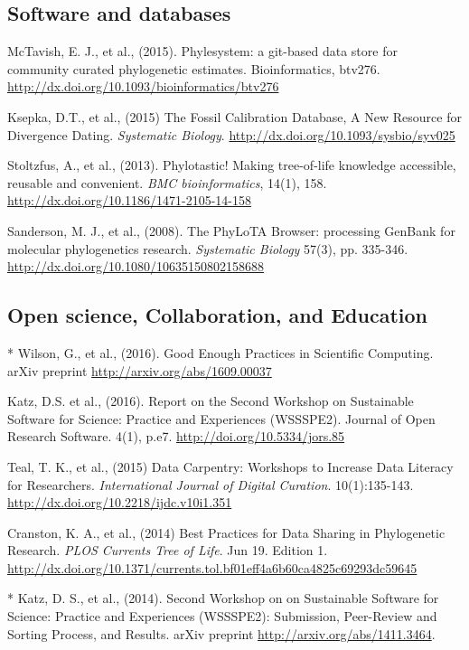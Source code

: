 \documentclass[10pt]{article}
\begin{document}
\subsection*{Software and databases}
McTavish, E. J., et al., (2015). Phylesystem: a git-based data store for community curated phylogenetic estimates. Bioinformatics, btv276. \url{http://dx.doi.org/10.1093/bioinformatics/btv276} 

Ksepka, D.T., et al., (2015) The Fossil Calibration Database, A New Resource for Divergence Dating. \textit{Systematic Biology}. \url{http://dx.doi.org/10.1093/sysbio/syv025}

Stoltzfus, A., et al., (2013). Phylotastic! Making tree-of-life knowledge accessible, reusable and convenient. \textit{BMC bioinformatics}, 14(1), 158. \url{http://dx.doi.org/10.1186/1471-2105-14-158} 

Sanderson, M. J., et al., (2008). The PhyLoTA Browser: processing GenBank for molecular phylogenetics research. \textit{Systematic Biology} 57(3), pp. 335-346. \url{http://dx.doi.org/10.1080/10635150802158688} 

\subsection*{Open science, Collaboration, and Education}
* Wilson, G., et al., (2016). Good Enough Practices in Scientific Computing. arXiv preprint \url{http://arxiv.org/abs/1609.00037}

Katz, D.S. et al., (2016). Report on the Second Workshop on Sustainable Software for Science: Practice and Experiences (WSSSPE2). Journal of Open Research Software. 4(1), p.e7. \url{http://doi.org/10.5334/jors.85}

Teal, T. K., et al., (2015) Data Carpentry: Workshops to Increase Data Literacy for Researchers. \textit{International Journal of Digital Curation}. 10(1):135-143. \url{http://dx.doi.org/10.2218/ijdc.v10i1.351}
 
Cranston, K. A., et al., (2014) Best Practices for Data Sharing in Phylogenetic Research. \textit{PLOS Currents Tree of Life}. Jun 19. Edition 1. \\
\url{http://dx.doi.org/10.1371/currents.tol.bf01eff4a6b60ca4825c69293dc59645} 

* Katz, D. S., et al., (2014). Second Workshop on on Sustainable Software for Science: Practice and Experiences (WSSSPE2): Submission, Peer-Review and Sorting Process, and Results. arXiv preprint \url{http://arxiv.org/abs/1411.3464}.
\end{document}
